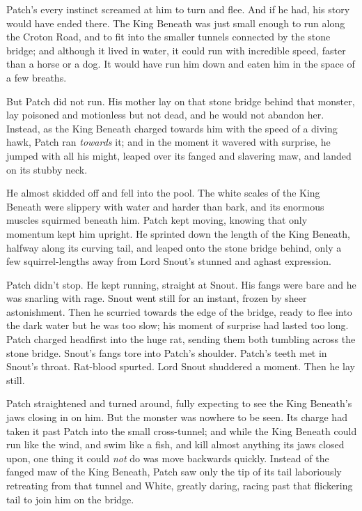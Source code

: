 \documentclass[12pt]{book}
\begin{document}
 Patch's every instinct screamed at him to turn and flee. And if he had, his story would have ended there. The King Beneath was just small enough to run along the Croton Road, and to fit into the smaller tunnels connected by the stone bridge; and although it lived in water, it could run with incredible speed, faster than a horse or a dog. It would have run him down and eaten him in the space of a few breaths.\par
 But Patch did not run. His mother lay on that stone bridge behind that monster, lay poisoned and motionless but not dead, and he would not abandon her. Instead, as the King Beneath charged towards him with the speed of a diving hawk, Patch ran {\it towards} it; and in the moment it wavered with surprise, he jumped with all his might, leaped over its fanged and slavering maw, and landed on its stubby neck.\par
 He almost skidded off and fell into the pool. The white scales of the King Beneath were slippery with water and harder than bark, and its enormous muscles squirmed beneath him. Patch kept moving, knowing that only momentum kept him upright. He sprinted down the length of the King Beneath, halfway along its curving tail, and leaped onto the stone bridge behind, only a few squirrel-lengths away from Lord Snout's stunned and aghast expression.\par
Patch didn't stop. He kept running, straight at Snout. His fangs were bare and he was snarling with rage. Snout went still for an instant, frozen by sheer astonishment. Then he scurried towards the edge of the bridge, ready to flee into the dark water %
 but he was too slow; his moment of surprise had lasted too long. Patch charged headfirst into the huge rat, sending them both tumbling across the stone bridge. Snout's fangs tore into Patch's shoulder. Patch's teeth met in Snout's throat. Rat-blood spurted. Lord Snout shuddered a moment. Then he lay still.\par
Patch straightened and turned around, fully expecting to see the King Beneath's jaws closing in on him. But the monster was nowhere to be seen. Its charge had taken it past Patch into the small cross-tunnel; and while the King Beneath could run like the wind, and swim like a fish, and kill almost anything its jaws closed upon, one thing it could {\it not} do was move backwards quickly. Instead of the fanged maw of the King Beneath, Patch saw only the tip of its tail laboriously retreating from that tunnel %
 and White, greatly daring, racing past that flickering tail to join him on the bridge.\par
\end{document}
